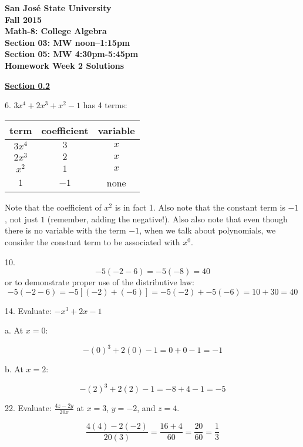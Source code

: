\documentclass[letterpaper]{article}
\begin{document}
\newcommand{\?}{\stackrel{?}{=}}

\begin{center}
\bfseries
San Jos\'{e} State University \\
Fall 2015 \\
Math-8: College Algebra \\
Section 03: MW noon--1:15pm \\
Section 05: MW 4:30pm-5:45pm \\
\bigskip
Homework Week 2 Solutions
\end{center}

\underline{\textbf{Section 0.2}}

\bigskip

6.  $3x^4 + 2x^3 + x^2 - 1$ has 4 terms:

\bigskip

\begin{tabular}{|c|c|c|}
\hline
term & coefficient & variable \\
\hline
$3x^4$ & $3$ & $x$ \\
\hline
$2x^3$ & $2$ & $x$ \\
\hline
$x^2$ & $1$ & $x$ \\
\hline
$1$ & $-1$ & none \\
\hline
\end{tabular}

\bigskip

Note that the coefficient of $x^2$ is in fact 1.  Also note that the constant
term is $-1$, not just $1$ (remember, adding the negative!).  Also also note
that even though there is no variable with the term $-1$, when we talk about
polynomials, we consider the constant term to be associated with $x^0$.

\bigskip

10. \[ -5(-2-6) = -5(-8) = 40 \]
or to demonstrate proper use of the distributive law:
\[ -5(-2-6) = -5[(-2)+(-6)] = -5(-2)+-5(-6) = 10 + 30 = 40 \]

\bigskip

14. Evaluate: $-x^3 + 2x - 1$

\bigskip

a. At $x = 0$:

\[ -(0)^3 + 2(0) - 1 = 0 + 0 - 1 = -1 \]

b. At $x = 2$:

\[ -(2)^3 + 2(2) - 1 = -8 + 4 - 1 = -5 \]

22. Evaluate: $\frac{4z - 2y}{20x}$ at $x = 3$, $y = -2$, and $z = 4$.

\[ \frac{4(4) - 2(-2)}{20(3)} = \frac{16 + 4}{60}  = \frac{20}{60} =
  \frac{1}{3} \]
\end{document}
